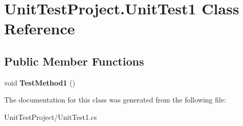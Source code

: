 \hypertarget{class_unit_test_project_1_1_unit_test1}{}\section{Unit\+Test\+Project.\+Unit\+Test1 Class Reference}
\label{class_unit_test_project_1_1_unit_test1}
\subsection*{Public Member Functions}
\begin{DoxyCompactItemize}
\item 
\mbox{\label{class_unit_test_project_1_1_unit_test1_a1cd53bf019a6a5ac0422147c8b1434da}} 
void {\bfseries Test\+Method1} ()
\end{DoxyCompactItemize}


The documentation for this class was generated from the following file\+:\begin{DoxyCompactItemize}
\item 
Unit\+Test\+Project/Unit\+Test1.\+cs\end{DoxyCompactItemize}
